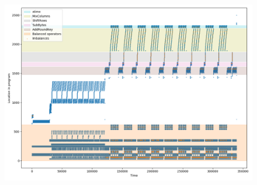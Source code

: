 \documentclass[11pt,t,usepdftitle=false,aspectratio=169]{beamer}
\begin{document}
\begin{frame}
  \begin{figure}
    \centering
    \includegraphics[height=\textheight]{imbalances-0.png}
  \end{figure}
\end{frame}
\end{document}
